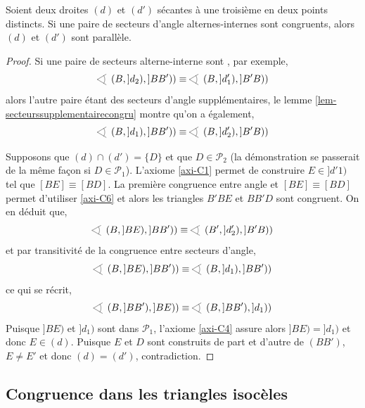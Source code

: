 \begin{thm}
    Soient deux droites $(d)$ et $(d')$ sécantes à une troisième en deux points distincts. Si une paire de secteurs d'angle alternes-internes sont congruents, alors $(d)$ et $(d')$ sont parallèle.  
\begin{proof}
    Si une paire de secteurs alterne-interne sont , par exemple,
    \begin{equation*}
        \anglesaillant\left(B,]d_2),]BB')\right) \equiv \anglesaillant\left(B,]d_1'),]B'B)\right)
    \end{equation*}
    alors l'autre paire étant des secteurs d'angle supplémentaires, le lemme \ref{lem-secteurssupplementairecongru} montre qu'on a également,
    \begin{equation*}
        \anglesaillant\left(B,]d_1),]BB')\right) \equiv \anglesaillant\left(B,]d_2'),]B'B)\right)
    \end{equation*}

    Supposons que $(d)\cap(d')=\{D\}$ et que $D \in \mathcal{P}_2$ (la démonstration se passerait de la même façon si $D\in\mathcal{P}_1$). L'axiome \ref{axi-C1} permet de construire $E\in ]d'1)$ tel que $[BE]\equiv [BD]$. La première congruence entre angle et $[BE]\equiv [BD]$ permet d'utiliser \ref{axi-C6} et alors les triangles $B'B E$ et $BB'D$ sont congruent. On en déduit que,
    \begin{equation*}
        \anglesaillant\left(B,]BE),]BB')\right)\equiv \anglesaillant\left(B',]d_2'),]B'B)\right)
    \end{equation*}
    et par transitivité de la congruence entre secteurs d'angle, 
    \begin{equation*}
        \anglesaillant\left(B,]BE),]BB')\right)\equiv \anglesaillant\left(B,]d_1),]BB')\right) 
    \end{equation*}
    ce qui se récrit,
    \begin{equation*}
        \anglesaillant\left(B,]BB'),]BE)\right)\equiv \anglesaillant\left(B,]BB'),]d_1)\right) 
    \end{equation*}
    Puisque $]BE)$ et $]d_1)$ sont dans $\mathcal{P}_1$, l'axiome \ref{axi-C4} assure alors $]BE)=]d_1)$ et donc $E\in (d)$. Puisque $E$ et $D$ sont construits de part et d'autre de $(BB')$, $E\neq E'$ et donc $(d)=(d')$, contradiction. 
\end{proof}
\end{thm}

        \subsection{Congruence dans les triangles isocèles}

